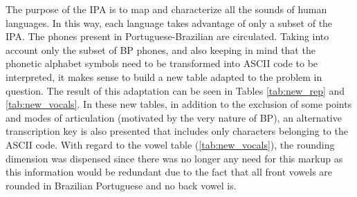 \begin{center}
\begin{tabular}

		\begin{vowel}
		\end{vowel}
	
\label{tab:ipa2}
\end{tabular}
\end{center} 
The purpose of the IPA is to map and characterize all the sounds of human languages. In this way, each language takes advantage of only a subset of the IPA. The phones present in Portuguese-Brazilian are circulated. Taking into account only the subset of BP phones, and also keeping in mind that the phonetic alphabet symbols need to be transformed into ASCII code to be interpreted, it makes sense to build a new table adapted to the problem in question. The result of this adaptation can be seen in Tables \ref{tab:new_rep} and \ref{tab:new_vocals}. In these new tables, in addition to the exclusion of some points and modes of articulation (motivated by the very nature of BP), an alternative transcription key is also presented that includes only characters belonging to the ASCII code. With regard to the vowel table (\ref{tab:new_vocals}), the rounding dimension was dispensed since there was no longer any need for this markup as this information would be redundant due to the fact that all front vowels are rounded in Brazilian Portuguese and no back vowel is.

